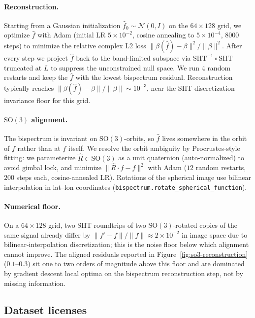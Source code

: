 \documentclass{article}
\theoremstyle{definition}
\theoremstyle{remark}
\newcommand{\SO}{\mathrm{SO}}
\theoremstyle{definition}
\begin{document}
\paragraph{Reconstruction.}
Starting from a Gaussian initialization $\hat f_0\sim\mathcal{N}(0, I)$
on the $64{\times}128$ grid, we optimize $\hat f$ with Adam
(initial LR $5\times 10^{-2}$, cosine annealing to $5\times 10^{-4}$,
$8000$ steps) to minimize the relative complex L2 loss
$\|\beta(\hat f) - \beta\|^2 / \|\beta\|^2$. After every step we
project $\hat f$ back to the band-limited subspace via $\mathrm{SHT}^{-1}\!\circ\mathrm{SHT}$ truncated at $L$ to suppress the
unconstrained null space. We run $4$ random restarts and keep the
$\hat f$ with the lowest bispectrum residual. Reconstruction
typically reaches $\|\beta(\hat f)-\beta\|/\|\beta\|\sim 10^{-3}$,
near the SHT-discretization invariance floor for this grid.

\paragraph{$\SO(3)$ alignment.}
The bispectrum is invariant on $\SO(3)$-orbits, so $\hat f$ lives
somewhere in the orbit of $f$ rather than at $f$ itself. We resolve
the orbit ambiguity by Procrustes-style fitting: we parameterize
$\hat R \in \SO(3)$ as a unit quaternion (auto-normalized) to avoid
gimbal lock, and minimize $\|\hat R\cdot\hat f - f\|^2$ with Adam
($12$ random restarts, $200$ steps each, cosine-annealed LR).
Rotations of the spherical image use bilinear interpolation in
lat--lon coordinates (\texttt{bispectrum.rotate\_spherical\_function}).

\paragraph{Numerical floor.}
On a $64{\times}128$ grid, two SHT roundtrips of two $\SO(3)$-rotated
copies of the same signal already differ by
$\|f' - f\|/\|f\|\approx 2\times 10^{-2}$ in image space due to
bilinear-interpolation discretization; this is the noise floor below
which alignment cannot improve. The aligned residuals reported in
Figure~\ref{fig:so3-reconstruction} ($0.1$--$0.3$) sit one to two
orders of magnitude above this floor and are dominated by gradient
descent local optima on the bispectrum reconstruction step, not by
missing information.

\subsection{Dataset licenses}
\end{document}
